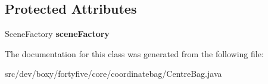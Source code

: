 \subsection*{Protected Attributes}
\begin{DoxyCompactItemize}
\item 
\hypertarget{classdev_1_1boxy_1_1fortyfive_1_1core_1_1coordinatebag_1_1_centre_bag_a9eec901db2e67a567e8394926b3a45dd}{
SceneFactory {\bfseries sceneFactory}}
\label{d6/d2f/classdev_1_1boxy_1_1fortyfive_1_1core_1_1coordinatebag_1_1_centre_bag_a9eec901db2e67a567e8394926b3a45dd}

\end{DoxyCompactItemize}


The documentation for this class was generated from the following file:\begin{DoxyCompactItemize}
\item 
src/dev/boxy/fortyfive/core/coordinatebag/CentreBag.java\end{DoxyCompactItemize}
